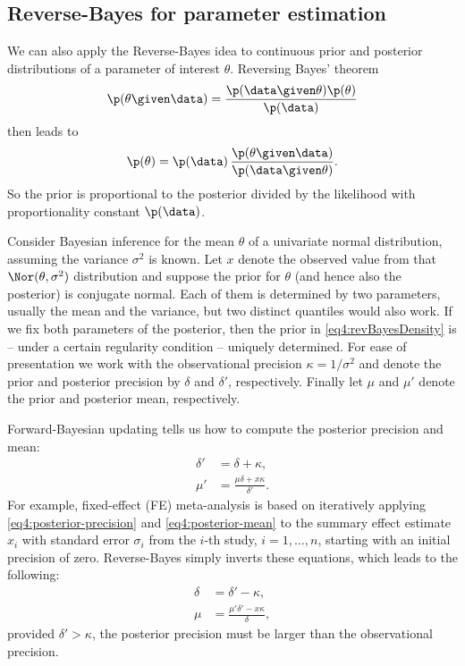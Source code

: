 \subsection{Reverse-Bayes for parameter estimation}
We can also apply the Reverse-Bayes idea to continuous prior and posterior
distributions of a parameter of interest $\theta$. Reversing Bayes' theorem
\begin{equation*}
  \p(\theta \given \data) = \frac{\p(\data \given \theta) \p(\theta)}{\p(\data)}
\end{equation*}
then leads to
\begin{equation}
  \p(\theta) = \p(\data) \, \frac{\p(\theta \given \data)}{\p(\data \given \theta)}.
\label{eq4:revBayesDensity}
\end{equation}
So the prior is proportional to the posterior divided by the likelihood with
proportionality constant $\p(\data)$.

Consider Bayesian inference for the mean $\theta$ of a univariate normal
distribution, assuming the variance $\sigma^2$ is known. Let $x$ denote the
observed value from that $\Nor(\theta, \sigma^2)$ distribution and suppose the
prior for $\theta$ (and hence also the posterior) is conjugate normal. Each of
them is determined by two parameters, usually the mean and the variance, but two
distinct quantiles would also work. If we fix both parameters of the posterior,
then the prior in \eqref{eq4:revBayesDensity} is -- under a certain regularity
condition -- uniquely determined. For ease of presentation we work with the
observational precision $\kappa=1/\sigma^2$ and denote the prior and posterior
precision by $\delta$ and $\delta'$, respectively. Finally let $\mu$ and $\mu'$
denote the prior and posterior mean, respectively.

Forward-Bayesian updating tells us how to compute the posterior precision and
mean:
\begin{align}
\label{eq4:posterior-precision}
\delta' &= \delta + \kappa, \\
\mu' &= \frac{\mu \delta + x \kappa}{\delta'}.\label{eq4:posterior-mean}
\end{align}
For example, fixed-effect (FE) meta-analysis is based on iteratively applying
\eqref{eq4:posterior-precision} and \eqref{eq4:posterior-mean} to the summary
effect estimate $x_i$ with standard error $\sigma_i$ from the $i$-th study,
$i=1,\ldots,n$, starting with an initial precision of zero. Reverse-Bayes simply
inverts these equations, which leads to the following:
\begin{align}
\label{eq4:prior-precision}
\delta &= \delta' - \kappa,  \\
\mu &= \frac{\mu'\delta' - x \kappa}{\delta}, \label{eq4:prior-mean}
\end{align}
provided $\delta' > \kappa$, \ie{} the posterior precision must be larger than the
observational precision.

